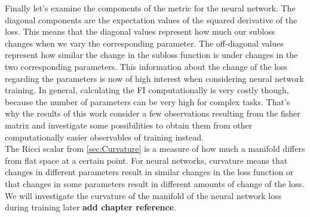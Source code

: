 Finally let's examine the components of the metric for the neural network. The diagonal components are the expectation values of the squared derivative of the loss. This means that the diagonal values represent how much our subloss changes when we vary the corresponding parameter. The off-diagonal values represent how similar the change in the subloss function is under changes in the two corresponding parameters. This information about the change of the loss regarding the parameters is now of high interest when considering neural network training. In general, calculating the FI computationally is very costly though, because the number of parameters can be very high for complex tasks. That's why the results of this work consider a few observations resulting from the fisher matrix and investigate some possibilities to obtain them from other computationally easier observables of training instead.\\
The Ricci scalar from \cref{sec:Curvature} is a measure of how much a manifold differs from flat space at a certain point. For neural networks, curvature means that changes in different parameters result in similar changes in the loss function or that changes in some parameters result in different amounts of change of the loss. We will investigate the curvature of the manifold of the neural network loss during training later \textbf{add chapter reference}.